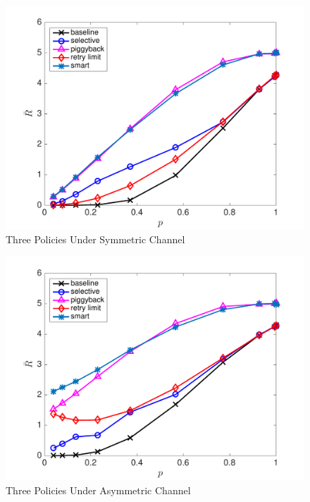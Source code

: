 \documentclass{article}
\begin{document}
\begin{figure}[htbp]
\centering
\includegraphics[scale=0.5]{3policycompare_sym.pdf}
\caption{Three Policies Under Symmetric Channel}
\label{Three Policies Under Symmetric Channel}
\end{figure}

\begin{figure}[htbp]
\centering
\includegraphics[scale=0.5]{3policycompare_asym.pdf}
\caption{Three Policies Under Asymmetric Channel}
\label{Three Policies Under Asymmetric Channel}
\end{figure}
\end{document}
